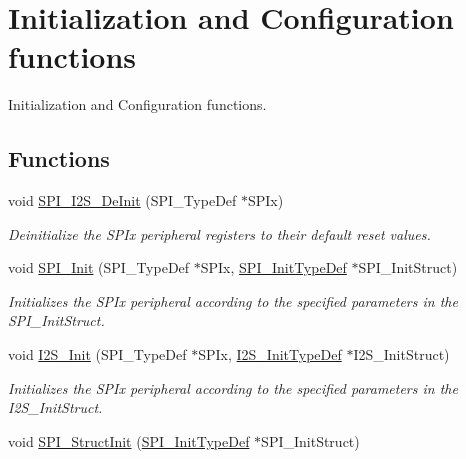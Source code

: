 \hypertarget{group___s_p_i___group1}{\section{Initialization and Configuration functions}
\label{group___s_p_i___group1}
}


Initialization and Configuration functions.  


\subsection*{Functions}
\begin{DoxyCompactItemize}
\item 
void \hyperlink{group___s_p_i___group1_gabe36880945fa56785283a9c0092124cc}{S\-P\-I\-\_\-\-I2\-S\-\_\-\-De\-Init} (S\-P\-I\-\_\-\-Type\-Def $\ast$S\-P\-Ix)
\begin{DoxyCompactList}\small\item\em Deinitialize the S\-P\-Ix peripheral registers to their default reset values. \end{DoxyCompactList}\item 
void \hyperlink{group___s_p_i___group1_ga8dacc1dc48bf08c0f12da409f4889037}{S\-P\-I\-\_\-\-Init} (S\-P\-I\-\_\-\-Type\-Def $\ast$S\-P\-Ix, \hyperlink{struct_s_p_i___init_type_def}{S\-P\-I\-\_\-\-Init\-Type\-Def} $\ast$S\-P\-I\-\_\-\-Init\-Struct)
\begin{DoxyCompactList}\small\item\em Initializes the S\-P\-Ix peripheral according to the specified parameters in the S\-P\-I\-\_\-\-Init\-Struct. \end{DoxyCompactList}\item 
void \hyperlink{group___s_p_i___group1_ga53661884ae4a9640df7cbc59187782f7}{I2\-S\-\_\-\-Init} (S\-P\-I\-\_\-\-Type\-Def $\ast$S\-P\-Ix, \hyperlink{struct_i2_s___init_type_def}{I2\-S\-\_\-\-Init\-Type\-Def} $\ast$I2\-S\-\_\-\-Init\-Struct)
\begin{DoxyCompactList}\small\item\em Initializes the S\-P\-Ix peripheral according to the specified parameters in the I2\-S\-\_\-\-Init\-Struct. \end{DoxyCompactList}\item 
void \hyperlink{group___s_p_i___group1_ga9a0116f88cc2c4478c270f05608703f1}{S\-P\-I\-\_\-\-Struct\-Init} (\hyperlink{struct_s_p_i___init_type_def}{S\-P\-I\-\_\-\-Init\-Type\-Def} $\ast$S\-P\-I\-\_\-\-Init\-Struct)

\end{DoxyCompactItemize}
